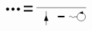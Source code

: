 \begin{equation}
\begin{tikzpicture}[x=0.55pt,y=0.55pt,yscale=-1,xscale=1]
\draw  [fill={rgb, 255:red, 0; green, 0; blue, 0 }  ,fill opacity=1 ] (332.07,82.67) .. controls (332.07,81.27) and (333.2,80.13) .. (334.6,80.13) .. controls (336,80.13) and (337.13,81.27) .. (337.13,82.67) .. controls (337.13,84.07) and (336,85.2) .. (334.6,85.2) .. controls (333.2,85.2) and (332.07,84.07) .. (332.07,82.67) -- cycle ;
\draw  [fill={rgb, 255:red, 0; green, 0; blue, 0 }  ,fill opacity=1 ] (342.07,82.67) .. controls (342.07,81.27) and (343.2,80.13) .. (344.6,80.13) .. controls (346,80.13) and (347.13,81.27) .. (347.13,82.67) .. controls (347.13,84.07) and (346,85.2) .. (344.6,85.2) .. controls (343.2,85.2) and (342.07,84.07) .. (342.07,82.67) -- cycle ;
\draw  [fill={rgb, 255:red, 0; green, 0; blue, 0 }  ,fill opacity=1 ] (352.07,82.67) .. controls (352.07,81.27) and (353.2,80.13) .. (354.6,80.13) .. controls (356,80.13) and (357.13,81.27) .. (357.13,82.67) .. controls (357.13,84.07) and (356,85.2) .. (354.6,85.2) .. controls (353.2,85.2) and (352.07,84.07) .. (352.07,82.67) -- cycle ;
\draw    (479.88,80) -- (387.88,80) ;
\draw [line width=1.5]    (364.62,77.73) -- (380.88,77.73) ;
\draw [line width=1.5]    (364.62,85.73) -- (380.88,85.73) ;
\draw    (406,113) -- (406,86.6) ;
\draw  [fill={rgb, 255:red, 0; green, 0; blue, 0 }  ,fill opacity=1 ] (405.88,95.2) -- (409.46,104.4) -- (402.54,104.4) -- cycle ;
\draw   (463.1,97.26) .. controls (463.1,92.98) and (466.57,89.51) .. (470.85,89.51) .. controls (475.13,89.51) and (478.6,92.98) .. (478.6,97.26) .. controls (478.6,101.54) and (475.13,105.01) .. (470.85,105.01) .. controls (466.57,105.01) and (463.1,101.54) .. (463.1,97.26) -- cycle ;
\draw    (448.24,97.26) .. controls (449.91,95.59) and (451.57,95.59) .. (453.24,97.26) .. controls (454.91,98.93) and (456.57,98.93) .. (458.24,97.26) -- (463.1,97.26) -- (463.1,97.26) ;
\draw  [fill={rgb, 255:red, 0; green, 0; blue, 0 }  ,fill opacity=1 ] (467.95,89.72) -- (473.59,87.11) -- (473.91,91.48) -- cycle ;
\draw [line width=1.5]    (427.62,96.73) -- (439.88,96.73) ;


\end{tikzpicture}
\end{equation}
